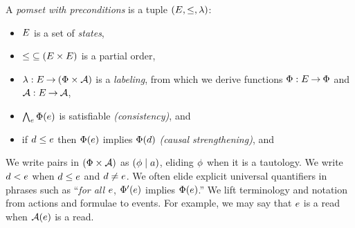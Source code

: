 \begin{definition}
  \label{def:mmpomset}
  A \emph{pomset with preconditions} is a tuple
  $(\Event, {\le}, %
  \labeling)$: %
  \begin{itemize}
  \item $E$ is a set of \emph{states},
  \item ${\le} \subseteq (E\times E)$ is a partial order, 
  \item $\lambda: E \mathbin\rightarrow (\Phi\times\mathcal{A})$ is a \emph{labeling},
    from which we derive functions $\Phi:E\mathbin\rightarrow\Phi$ and $\mathcal{A}:E\mathbin\rightarrow\mathcal{A}$,
  \item $\bigwedge_{e}\Phi(e)$ is satisfiable
    \emph{(consistency)}, and
  \item if $d\le e$ then $\Phi(e)$ implies
    $\Phi(d)$ \emph{(causal strengthening)}, and
  \end{itemize}
\end{definition}


We write pairs in $(\Phi\times\mathcal{A})$ as $(\phi \mid a)$, eliding
$\phi$ when it is a tautology.
%
We write $d<e$ when $d\le e$ and $d\neq e$.
%
We often elide explicit universal quantifiers in phrases such as ``\emph{for
  all $e$}, $\Phi'(e)$ implies $\Phi(e)$.''  We
lift terminology and notation from actions and formulae to events.  For
example, we may say that $e$ is a read when $\mathcal{A}(e)$ is a
read.






